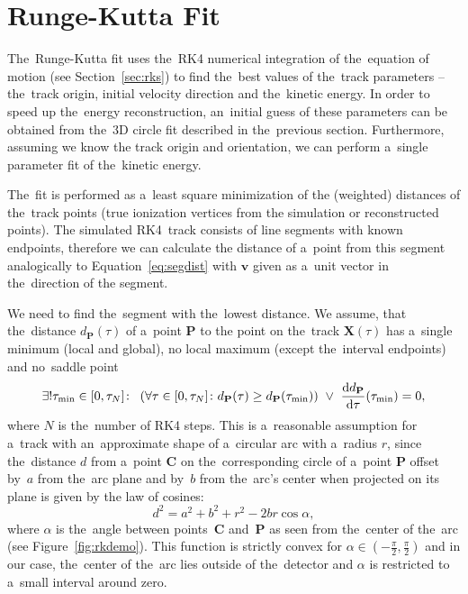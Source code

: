 	\section{Runge-Kutta Fit}
	\label{sec:rkfit}
		The~Runge-Kutta fit uses the~\acf{RK4} numerical integration of the~equation of motion (see Section~\ref{sec:rks}) to find the~best values of the~track parameters -- the~track origin, initial velocity direction and the~kinetic energy. In order to speed up the~energy reconstruction, an~initial guess of these parameters can be obtained from the~3D circle fit described in the~previous section. Furthermore, assuming we know the track origin and orientation, we can perform a~single parameter fit of the~kinetic energy.
		
		The~fit is performed as a~least square minimization of the (weighted) distances of the~track points (true ionization vertices from the simulation or reconstructed points). The simulated \ac{RK4}~track consists of line segments with known endpoints, therefore we can calculate the distance of a~point from this segment analogically to Equation~\ref{eq:segdist} with $\mathbf{v}$ given as a~unit vector in the~direction of the segment.
		
		We need to find the~segment with the~lowest distance. We assume, that the~distance $d_\mathbf{P}(\tau)$ of a~point $\mathbf{P}$ to the point on the~track $\mathbf{X}(\tau)$ has a~single minimum (local and global), no local maximum (except the~interval endpoints) and no~saddle point
			\begin{equation}
				\label{eq:rk_assum}
				\exists!\tau_\text{min}\in[0,\tau_N]\colon\ \left(\forall\tau\in[0,\tau_N]\colon  d_{\mathbf{P}}(\tau) \geq d_{\mathbf{P}}(\tau_\text{min})\right)\ \lor\ \dv{d_{\mathbf{P}}}{\tau}{(\tau_\text{min})} = 0,
			\end{equation}
		where $N$ is the~number of \ac{RK4} steps. This is a~reasonable assumption for a~track with an~approximate shape of a~circular arc with a~radius $r$, since the~distance $d$ from a~point $\mathbf{C}$ on the~corresponding circle of a~point $\mathbf{P}$ offset by~$a$ from the~arc plane and by~$b$ from the~arc's center when projected on its plane is given by the law of cosines:
			\begin{equation}
				\label{eq:rkdemo}
				d^2 = a^2+b^2+r^2 - 2br\cos\alpha,
			\end{equation}
		where $\alpha$ is the~angle between points~$\mathbf{C}$ and~$\mathbf{P}$ as seen from the~center of the~arc (see Figure~\ref{fig:rkdemo}). This function is strictly convex for $\alpha\in\left(-\frac{\pi}{2},\frac{\pi}{2}\right)$ and in our case, the~center of the~arc lies outside of the~detector and $\alpha$ is restricted to a~small interval around zero.
		
